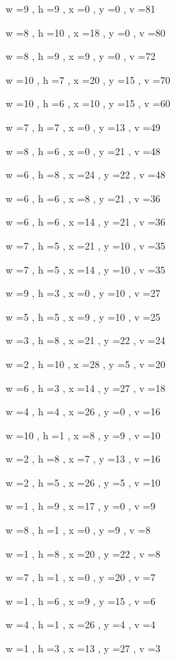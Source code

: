 \documentclass[11pt]{article}
\begin{document}
w =9 , h =9 , x =0 , y =0 , v =81
\par
w =8 , h =10 , x =18 , y =0 , v =80
\par
w =8 , h =9 , x =9 , y =0 , v =72
\par
w =10 , h =7 , x =20 , y =15 , v =70
\par
w =10 , h =6 , x =10 , y =15 , v =60
\par
w =7 , h =7 , x =0 , y =13 , v =49
\par
w =8 , h =6 , x =0 , y =21 , v =48
\par
w =6 , h =8 , x =24 , y =22 , v =48
\par
w =6 , h =6 , x =8 , y =21 , v =36
\par
w =6 , h =6 , x =14 , y =21 , v =36
\par
w =7 , h =5 , x =21 , y =10 , v =35
\par
w =7 , h =5 , x =14 , y =10 , v =35
\par
w =9 , h =3 , x =0 , y =10 , v =27
\par
w =5 , h =5 , x =9 , y =10 , v =25
\par
w =3 , h =8 , x =21 , y =22 , v =24
\par
w =2 , h =10 , x =28 , y =5 , v =20
\par
w =6 , h =3 , x =14 , y =27 , v =18
\par
w =4 , h =4 , x =26 , y =0 , v =16
\par
w =10 , h =1 , x =8 , y =9 , v =10
\par
w =2 , h =8 , x =7 , y =13 , v =16
\par
w =2 , h =5 , x =26 , y =5 , v =10
\par
w =1 , h =9 , x =17 , y =0 , v =9
\par
w =8 , h =1 , x =0 , y =9 , v =8
\par
w =1 , h =8 , x =20 , y =22 , v =8
\par
w =7 , h =1 , x =0 , y =20 , v =7
\par
w =1 , h =6 , x =9 , y =15 , v =6
\par
w =4 , h =1 , x =26 , y =4 , v =4
\par
w =1 , h =3 , x =13 , y =27 , v =3
\par
\newpage


\end{document}
